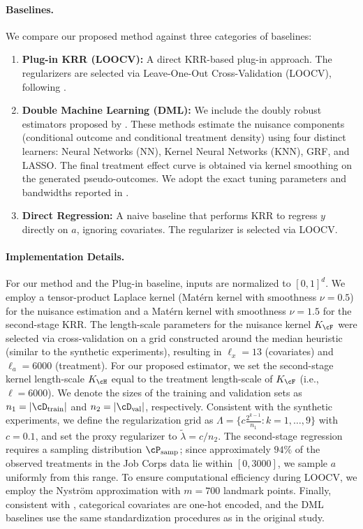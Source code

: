 \documentclass[english,11pt]{article}
\begin{document}
\paragraph{Baselines.}
We compare our proposed method against three categories of baselines:
\begin{enumerate}
    \item \textbf{Plug-in KRR (LOOCV):} A direct KRR-based plug-in approach. The regularizers are selected via Leave-One-Out Cross-Validation (LOOCV), following \citet{singh2024kernel}.
    \item \textbf{Double Machine Learning (DML):} We include the doubly robust estimators proposed by \citet{colangelo2025double}. These methods estimate the nuisance components (conditional outcome and conditional treatment density) using four distinct learners: Neural Networks (NN), Kernel Neural Networks (KNN), GRF, and LASSO. The final treatment effect curve is obtained via kernel smoothing on the generated pseudo-outcomes. We adopt the exact tuning parameters and bandwidths reported in \citet{colangelo2025double}.
    \item \textbf{Direct Regression:} A naive baseline that performs KRR to regress \(y\) directly on \(a\), ignoring covariates. The regularizer is selected via LOOCV.
\end{enumerate}

\paragraph{Implementation Details.}
For our method and the Plug-in baseline, inputs are normalized to \([0,1]^d\).
We employ a tensor-product Laplace kernel (Mat\'ern kernel with smoothness $\nu=0.5$) for the nuisance estimation and a Mat\'ern kernel with smoothness $\nu=1.5$ for the second-stage KRR.
The length-scale parameters for the nuisance kernel \(K_\cF\) were selected via cross-validation on a grid constructed around the median heuristic (similar to the synthetic experiments), resulting in \(\ell_x = 13\) (covariates) and \(\ell_a = 6000\) (treatment).
For our proposed estimator, we set the second-stage kernel length-scale \(K_\cH\) equal to the treatment length-scale of \(K_\cF\) (i.e., \(\ell = 6000\)).
We denote the sizes of the training and validation sets as $n_1 = |\cD_{\text{train}}|$ and $n_2 = |\cD_{\text{val}}|$, respectively.
Consistent with the synthetic experiments, we define the regularization grid as $\Lambda = \{ c \frac{2^{k-1}}{n_1} : k = 1,\dots,9 \}$ with $c = 0.1$, and set the proxy regularizer to $\tilde{\lambda} = c/n_2$.
The second-stage regression requires a sampling distribution \(\cP_{\operatorname{samp}}\); since approximately \(94\%\) of the observed treatments in the Job Corps data lie within \([0, 3000]\), we sample \(a\) uniformly from this range.
To ensure computational efficiency during LOOCV, we employ the Nyström approximation with \(m = 700\) landmark points.
Finally, consistent with \citet{colangelo2025double}, categorical covariates are one-hot encoded, and the DML baselines use the same standardization procedures as in the original study.
\end{document}
